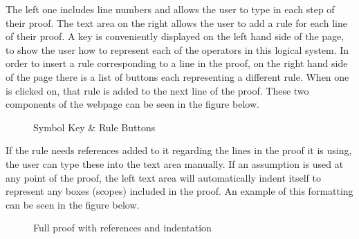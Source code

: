 The left one includes line numbers and allows the user to type in each step of their proof. The text area on the right allows the user to add a rule for each line of their proof. A key is conveniently displayed on the left hand side of the page, to show the user how to represent each of the operators in this logical system. In order to insert a rule corresponding to a line in the proof, on the right hand side of the page there is a list of buttons each representing a different rule. When one is clicked on, that rule is added to the next line of the proof. These two components of the webpage can be seen in the figure below.

\begin{figure}[!ht]
	\centering
	\caption{Symbol Key \& Rule Buttons}
\end{figure}

If the rule needs references added to it regarding the lines in the proof it is using, the user can type these into the text area manually. If an assumption is used at any point of the proof, the left text area will automatically indent itself to represent any boxes (scopes) included in the proof. An example of this formatting can be seen in the figure below.

\begin{figure}[!ht]
	\centering
	\caption{Full proof with references and indentation}
\end{figure}



